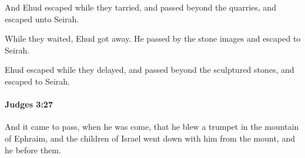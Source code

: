 			\begin{versebox}
					\item[BHS] 
					\item[ASV] And Ehud escaped while they tarried, and passed beyond the quarries, and escaped unto Seirah.
					\item[NIV] While they waited, Ehud got away. He passed by the stone images and escaped to Seirah.
					\item[NRSV] Ehud escaped while they delayed, and passed beyond the sculptured stones, and escaped to Seirah.
			\end{versebox}

		\paragraph{Judges 3:27} %
			\label{JUDGES-3-27}

			And it came to pass, when he was come, that he blew a trumpet in the mountain of Ephraim, and the children of Israel went down with him from the mount, and he before them.

